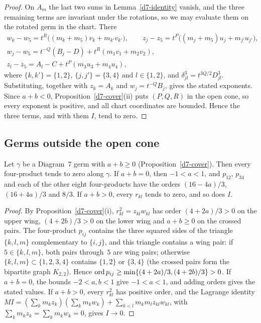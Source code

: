 \begin{proof}
On $A_m$ the last two sums in Lemma~\ref{d7-identity} vanish, and the three remaining terms are
invariant under the rotations, so we may evaluate them on the rotated germ in the chart.  There
\begin{gather*}
  w_k-w_5=t^R\bigl((m_k+m_5)v_k+m_{k'}v_{k'}\bigr),\qquad
  z_j-z_5=t^P\bigl((m_j+m_5)u_j+m_{j'}u_{j'}\bigr),\\
  w_j-w_5=t^{-Q}(B_j-D)+t^R(m_1v_1+m_2v_2),\\
  z_l-z_5=A_l-C+t^P(m_3u_3+m_4u_4),
\end{gather*}
where $\{k,k'\}=\{1,2\}$, $\{j,j'\}=\{3,4\}$ and $l\in\{1,2\}$, and
$\delta_{jl}^3=t^{3Q/2}D_{jl}^3$.  Substituting, together with $z_k=A_k$ and $w_j=t^{-Q}B_j$,
gives the stated exponents.  Since $a+b<0$, Proposition~\ref{d7-cover}(ii) puts $(P,Q,R)$ in the
open cone, so every exponent is positive, and all chart coordinates are bounded.  Hence the three
terms, and with them $I$, tend to zero.
\end{proof}

\subsection{Germs outside the open cone}

\begin{lemma}\label{d7-bounded}
Let $\gamma$ be a Diagram~7 germ with $a+b\ge0$ (Proposition~\ref{d7-cover}).  Then every
four-product tends to zero along $\gamma$.  If $a+b=0$, then $-1<a<1$, and $p_{12}$, $p_{34}$
and each of the other eight four-products have the orders $(16-4a)/3$, $(16+4a)/3$ and $8/3$.
If $a+b>0$, every $r_{kl}$ tends to zero, and so does $I$.
\end{lemma}

\begin{proof}
By Proposition~\ref{d7-cover}(i), $r_{kl}^2=z_{kl}w_{kl}$ has order $(4+2a)/3>0$ on the upper
wing, $(4+2b)/3>0$ on the lower wing and $a+b\ge0$ on the crossed pairs.  The four-product
$p_{ij}$ contains the three squared sides of the triangle $\{k,l,m\}$ complementary to
$\{i,j\}$, and this triangle contains a wing pair: if $5\in\{k,l,m\}$, both pairs through~$5$
are wing pairs; otherwise $\{k,l,m\}\subset\{1,2,3,4\}$ contains $\{1,2\}$ or $\{3,4\}$ (the
crossed pairs form the bipartite graph $K_{2,2}$).  Hence
$\operatorname{ord} p_{ij}\ge\min\{(4+2a)/3,(4+2b)/3\}>0$.  If $a+b=0$, the bounds $-2<a,b<1$ give $-1<a<1$,
and adding orders gives the stated values.  If $a+b>0$, every $r_{kl}^2$ has positive order, and
the Lagrange identity $MI=(\sum_km_kz_k)(\sum_km_kw_k)+\sum_{k<l}m_km_lz_{kl}w_{kl}$, with
$\sum_km_kz_k=\sum_km_kw_k=0$, gives $I\to0$.
\end{proof}

